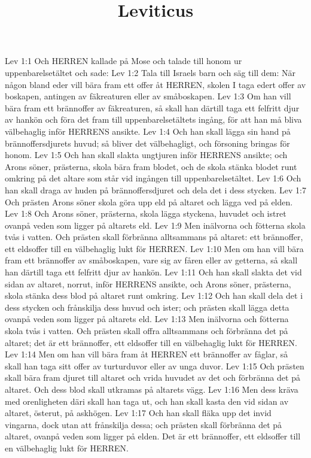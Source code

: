 

\title{Leviticus}

Lev 1:1  Och HERREN kallade på Mose och talade till honom ur uppenbarelsetältet och sade:
Lev 1:2  Tala till Israels barn och säg till dem: När någon bland eder vill bära fram ett offer åt HERREN, skolen I taga edert offer av boskapen, antingen av fäkreaturen eller av småboskapen.
Lev 1:3  Om han vill bära fram ett brännoffer av fäkreaturen, så skall han därtill taga ett felfritt djur av hankön och föra det fram till uppenbarelsetältets ingång, för att han må bliva välbehaglig inför HERRENS ansikte.
Lev 1:4  Och han skall lägga sin hand på brännoffersdjurets huvud; så bliver det välbehagligt, och försoning bringas för honom.
Lev 1:5  Och han skall slakta ungtjuren inför HERRENS ansikte; och Arons söner, prästerna, skola bära fram blodet, och de skola stänka blodet runt omkring på det altare som står vid ingången till uppenbarelsetältet.
Lev 1:6  Och han skall draga av huden på brännoffersdjuret och dela det i dess stycken.
Lev 1:7  Och prästen Arons söner skola göra upp eld på altaret och lägga ved på elden.
Lev 1:8  Och Arons söner, prästerna, skola lägga styckena, huvudet och istret ovanpå veden som ligger på altarets eld.
Lev 1:9  Men inälvorna och fötterna skola tvås i vatten. Och prästen skall förbränna alltsammans på altaret: ett brännoffer, ett eldsoffer till en välbehaglig lukt för HERREN.
Lev 1:10  Men om han vill bära fram ett brännoffer av småboskapen, vare sig av fåren eller av getterna, så skall han därtill taga ett felfritt djur av hankön.
Lev 1:11  Och han skall slakta det vid sidan av altaret, norrut, inför HERRENS ansikte, och Arons söner, prästerna, skola stänka dess blod på altaret runt omkring.
Lev 1:12  Och han skall dela det i dess stycken och frånskilja dess huvud och ister; och prästen skall lägga detta ovanpå veden som ligger på altarets eld.
Lev 1:13  Men inälvorna och fötterna skola tvås i vatten. Och prästen skall offra alltsammans och förbränna det på altaret; det är ett brännoffer, ett eldsoffer till en välbehaglig lukt för HERREN.
Lev 1:14  Men om han vill bära fram åt HERREN ett brännoffer av fåglar, så skall han taga sitt offer av turturduvor eller av unga duvor.
Lev 1:15  Och prästen skall bära fram djuret till altaret och vrida huvudet av det och förbränna det på altaret. Och dess blod skall utkramas på altarets vägg.
Lev 1:16  Men dess kräva med orenligheten däri skall han taga ut, och han skall kasta den vid sidan av altaret, österut, på askhögen.
Lev 1:17  Och han skall fläka upp det invid vingarna, dock utan att frånskilja dessa; och prästen skall förbränna det på altaret, ovanpå veden som ligger på elden. Det är ett brännoffer, ett eldsoffer till en välbehaglig lukt för HERREN.
